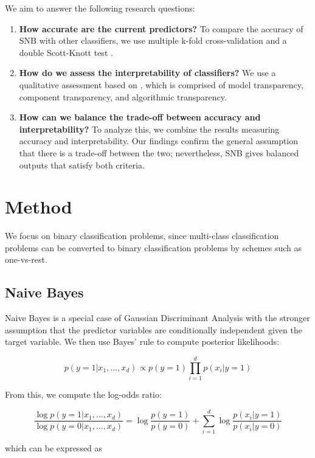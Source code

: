 \documentclass[sigconf]{acmart}
\begin{document}
We aim to answer the following research questions:
\begin{enumerate}
	\item \textbf{How accurate are the current predictors?} To compare the accuracy of SNB with other classifiers, we use multiple k-fold cross-validation and a double Scott-Knott test \cite{jelihovschi2014scottknott}.
	\item \textbf{How do we assess the interpretability of classifiers?} We use a qualitative assessment based on \cite{lipton2016mythos}, which is comprised of model transparency, component transparency, and algorithmic transparency.
	\item \textbf{How can we balance the trade-off between accuracy and interpretability?} To analyze this, we combine the results measuring accuracy and interpretability. Our findings confirm the general assumption that there is a trade-off between the two; nevertheless, SNB gives balanced outputs that satisfy both criteria.
\end{enumerate}

\section{Method}
We focus on binary classification problems, since multi-class classification problems can be converted to binary classification problems by schemes such as one-vs-rest.

\subsection{Naive Bayes}
Naive Bayes is a special case of Gaussian Discriminant Analysis with the stronger assumption that the predictor variables are conditionally independent given the target variable. We then use Bayes' rule to compute posterior likelihoods:

\begin{equation}
p(y=1|x_1,\ldots,x_d) \propto p(y=1)\prod\limits_{i=1}^d p(x_i|y=1)
\label{eq:1}
\end{equation}

From this, we compute the log-odds ratio:

\begin{equation}
\frac{\log p(y=1|x_1,\ldots,x_d)}{\log p(y=0|x_1,\ldots,x_d)} = \log \frac{p(y=1)}{p(y=0)} + \sum\limits_{i=1}^d \log \frac{p(x_i|y=1)}{p(x_i|y=0)}
\label{eq:2}
\end{equation}

which can be expressed as
\end{document}
